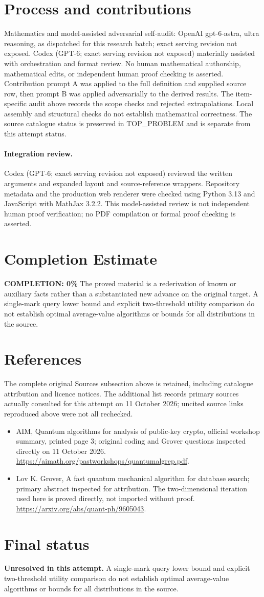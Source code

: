 \documentclass[11pt]{article}
\begin{document}
\section{Process and contributions}
Mathematics and model-assisted adversarial self-audit: OpenAI gpt-6-astra, ultra reasoning, as dispatched for this research batch; exact serving revision not exposed. Codex (GPT-6; exact serving revision not exposed) materially assisted with orchestration and format review. No human mathematical authorship, mathematical edits, or independent human proof checking is asserted.
Contribution prompt A was applied to the full definition and supplied source row, then prompt B was applied adversarially to the derived results. The item-specific audit above records the scope checks and rejected extrapolations. Local assembly and structural checks do not establish mathematical correctness. The source catalogue status is preserved in TOP\_PROBLEM and is separate from this attempt status.
\paragraph{Integration review.} Codex (GPT-6; exact serving revision not exposed) reviewed the written arguments and expanded layout and source-reference wrappers. Repository metadata and the production web renderer were checked using Python 3.13 and JavaScript with MathJax 3.2.2. This model-assisted review is not independent human proof verification; no PDF compilation or formal proof checking is asserted.

\section{Completion Estimate}
\noindent\textbf{COMPLETION: 0\%}
The proved material is a rederivation of known or auxiliary facts rather than a substantiated new advance on the original target. A single-mark query lower bound and explicit two-threshold utility comparison do not establish optimal average-value algorithms or bounds for all distributions in the source.
\section{References}
The complete original Sources subsection above is retained, including catalogue attribution and licence notices. The additional list records primary sources actually consulted for this attempt on 11 October 2026; uncited source links reproduced above were not all rechecked.
\begin{itemize}
\item AIM, Quantum algorithms for analysis of public-key crypto, official workshop summary, printed page 3; original coding and Grover questions inspected directly on 11 October 2026. \url{https://aimath.org/pastworkshops/quantumalgrep.pdf}.
\item Lov K. Grover, A fast quantum mechanical algorithm for database search; primary abstract inspected for attribution. The two-dimensional iteration used here is proved directly, not imported without proof. \url{https://arxiv.org/abs/quant-ph/9605043}.
\end{itemize}
\section{Final status}
\textbf{Unresolved in this attempt.} A single-mark query lower bound and explicit two-threshold utility comparison do not establish optimal average-value algorithms or bounds for all distributions in the source.
\end{document}
